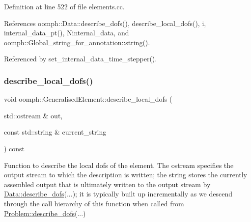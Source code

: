 Definition at line 522 of file elements.\+cc.



References oomph\+::\+Data\+::describe\+\_\+dofs(), describe\+\_\+local\+\_\+dofs(), i, internal\+\_\+data\+\_\+pt(), Ninternal\+\_\+data, and oomph\+::\+Global\+\_\+string\+\_\+for\+\_\+annotation\+::string().



Referenced by set\+\_\+internal\+\_\+data\+\_\+time\+\_\+stepper().

\mbox{\label{classoomph_1_1GeneralisedElement_aa1a6edcb57e0d9c282b1e2bdca7a6e2a}} 
\subsubsection{\texorpdfstring{describe\+\_\+local\+\_\+dofs()}{describe\_local\_dofs()}}
{\footnotesize\ttfamily void oomph\+::\+Generalised\+Element\+::describe\+\_\+local\+\_\+dofs (\begin{DoxyParamCaption}\item[{std\+::ostream \&}]{out,  }\item[{const std\+::string \&}]{current\+\_\+string }\end{DoxyParamCaption}) const\hspace{0.3cm}{\ttfamily [virtual]}}



Function to describe the local dofs of the element. The ostream specifies the output stream to which the description is written; the string stores the currently assembled output that is ultimately written to the output stream by \hyperlink{classoomph_1_1Data_a2dae16e2dcff9a40029f834c83364df5}{Data\+::describe\+\_\+dofs}(...); it is typically built up incrementally as we descend through the call hierarchy of this function when called from \hyperlink{classoomph_1_1Problem_abc103804eb319ae0b3d43870cc3e1eaf}{Problem\+::describe\+\_\+dofs}(...) 



